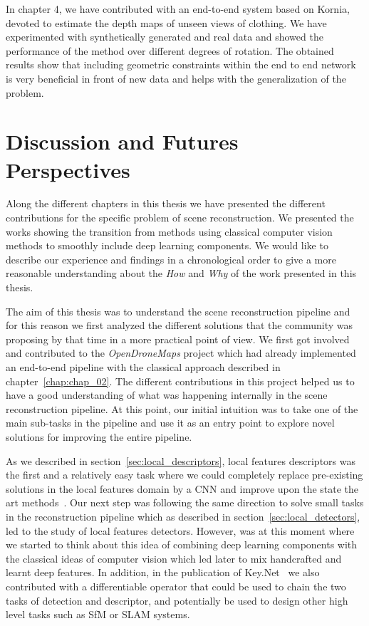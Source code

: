 In chapter 4, we have contributed with an end-to-end system based on Kornia, devoted to estimate the depth maps of unseen views of clothing. We have experimented with synthetically generated and real data and showed the performance of the method over different degrees of rotation. The obtained results show that including geometric constraints within the end to end network is very beneficial in front of new data and helps with the generalization of the problem.


\section{Discussion and Futures Perspectives}

Along the different chapters in this thesis we have presented the different contributions for the specific problem of scene reconstruction. We presented the works showing the transition from methods using classical computer vision methods to smoothly include deep learning components. We would like to describe our experience and findings in a chronological order to give a more reasonable understanding about the \textit{How} and \textit{Why} of the work presented in this thesis.

The aim of this thesis was to understand the scene reconstruction pipeline and for this reason we first analyzed the different solutions that the community was proposing by that time in a more practical point of view. We first got involved and contributed to the \textit{OpenDroneMaps} project which had already implemented an end-to-end pipeline with the classical approach described in chapter~\ref{chap:chap_02}. The different contributions in this project helped us to have a good understanding of what was happening internally in the scene reconstruction pipeline. At this point, our initial intuition was to take one of the main sub-tasks in the pipeline and use it as an entry point to explore novel solutions for improving the entire pipeline.

As we described in section~\ref{sec:local_descriptors}, local features descriptors was the first and a relatively easy task where we could completely replace pre-existing solutions in the local features domain by a CNN and improve upon the state the art methods~\cite{balntas2016bmvc}. Our next step was following the same direction to solve small tasks in the reconstruction pipeline which as described in section~\ref{sec:local_detectors}, led to the study of local features detectors. However, was at this moment where we started to think about this idea of combining deep learning components with the classical ideas of computer vision which led later to mix handcrafted and learnt deep features. In addition, in the publication of Key.Net~\cite{barroso2019keynet} we also contributed with a differentiable operator that could be used to chain the two tasks of detection and descriptor, and potentially be used to design other high level tasks such as SfM or SLAM systems.

